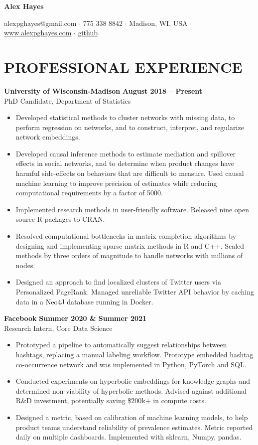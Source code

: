 \documentclass[11pt]{article}
\newcommand{\underlinedlink}[2]{\href{#1}{\ul{#2}}}
\begin{document}
\begin{center}
    {\huge\textbf{Alex Hayes}}

    \vspace{0.1cm}
    alexpghayes@gmail.com $\cdot$ 775 338 8842 $\cdot$ Madison, WI, USA $\cdot$ \underlinedlink{http://www.alexpghayes.com}{www.alexpghayes.com} $\cdot$ \underlinedlink{https://github.com}{github}
\end{center}

\section*{PROFESSIONAL EXPERIENCE}

 {\large \textbf{University of Wisconsin-Madison}} \hfill \textbf{August 2018 -- Present}\\
PhD Candidate, Department of Statistics
\begin{itemize}
    \item Developed statistical methods to cluster networks with missing data, to perform regression on networks, and to construct, interpret, and regularize network embeddings.
    \item Developed causal inference methods to estimate mediation and spillover effects in social networks, and to determine when product changes have harmful side-effects on behaviors that are difficult to measure. Used causal machine learning to improve precision of estimates while reducing computational requirements by a factor of 5000.
    \item Implemented research methods in user-friendly software. Released nine open source R packages to CRAN.
    \item Resolved computational bottlenecks in matrix completion algorithms by designing and implementing sparse matrix methods in R and C++. Scaled methods by three orders of magnitude to handle networks with millions of nodes.
    \item Designed an approach to find localized clusters of Twitter users via Personalized PageRank. Managed unreliable Twitter API behavior by caching data in a Neo4J database running in Docker.
\end{itemize}

{\large \textbf{Facebook}} \hfill \textbf{Summer 2020 \& Summer 2021}\\
Research Intern, Core Data Science
\begin{itemize}
    \item Prototyped a pipeline to automatically suggest relationships between hashtags, replacing a manual labeling workflow. Prototype embedded hashtag co-occurrence network and was implemented in Python, PyTorch and SQL.
    \item Conducted experiments on hyperbolic embeddings for knowledge graphs and determined non-viability of hyperbolic methods. Advised against additional R\&D investment, potentially saving \$200k+ in compute costs.
    \item Designed a metric, based on calibration of machine learning models, to help product teams understand reliability of prevalence estimates. Metric reported daily on multiple dashboards. Implemented with sklearn, Numpy, pandas.
\end{itemize}
\end{document}

